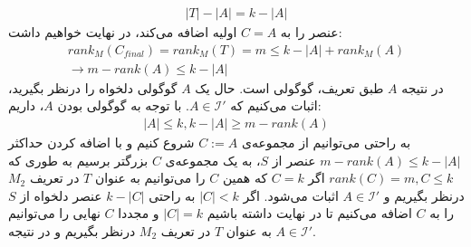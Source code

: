 \documentclass[a4paper,12pt]{article}
\begin{document}
\begin{align*}
	|T| - |A| = k - |A|	
\end{align*}
عنصر را به $C=A$ اولیه اضافه می‌کند، در نهایت خواهیم داشت:
\begin{align*}
	rank_M(C_{final}) = rank_M(T) = m \leq k - |A| + rank_M(A) \\ \rightarrow m - rank(A) \leq k - |A|
\end{align*}
در نتیجه $A$ طبق تعریف، گوگولی است.
\newline
حال یک $A$ گوگولی دلخواه را درنظر بگیرید، اثبات می‌کنیم که $A \in \mathcal{I'}$.
با توجه به گوگولی بودن $A$، داریم:
\begin{align*}
	|A| \leq k , k - |A| \geq m - rank(A)
\end{align*}
به راحتی می‌توانیم از مجموعه‌ی $C := A$ شروع کنیم و با اضافه کردن حداکثر 
$m - rank(A) \leq k - |A|$
عنصر از $S$، به یک مجموعه‌ی $C$ بزرگتر برسیم به طوری که
$rank(C) = m , C \leq k$
اگر 
$C = k$
که همین $C$ را می‌توانیم به عنوان $T$ در تعریف $M_2$ درنظر بگیریم و $A \in \mathcal{I'}$ اثبات می‌شود. اگر 
$|C| < k$
به راحتی 
$k - |C|$
عنصر دلخواه از $S$ را به $C$ اضافه می‌کنیم تا در نهایت داشته باشیم 
$|C| = k$
و مجددا $C$ نهایی را می‌توانیم به عنوان $T$ در تعریف $M_2$ درنظر بگیریم و در نتیجه 
$A \in \mathcal{I'}$.
\end{document}
